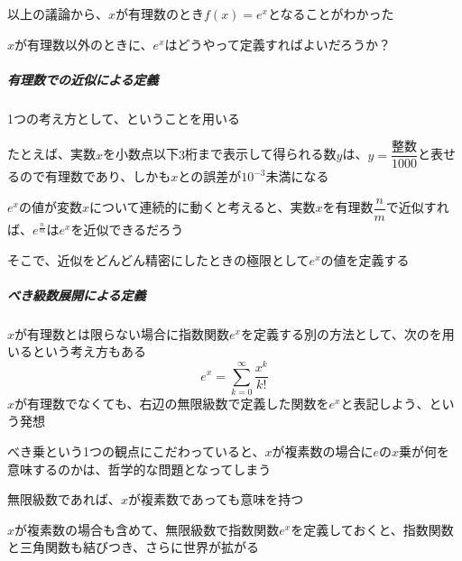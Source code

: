 \documentclass[../book_jiriki_calc]{subfiles}
\begin{document}
\sectionline

以上の議論から、$x$が有理数のとき$f(x)=e^x$となることがわかった

\br

$x$が有理数以外のときに、$e^x$はどうやって定義すればよいだろうか？

\br

\subparagraph{有理数での近似による定義}

1つの考え方として、ということを用いる

たとえば、実数$x$を小数点以下$3$桁まで表示して得られる数$y$は、$y=\dfrac{\text{整数}}{1000}$と表せるので有理数であり、しかも$x$との誤差が$10^{-3}$未満になる

\br

$e^x$の値が変数$x$について連続的に動くと考えると、実数$x$を有理数$\dfrac{n}{m}$で近似すれば、$e^{\frac{n}{m}}$は$e^x$を近似できるだろう

そこで、近似をどんどん精密にしたときの極限として$e^x$の値を定義する

\br

\subparagraph{べき級数展開による定義}

$x$が有理数とは限らない場合に指数関数$e^x$を定義する別の方法として、次のを用いるという考え方もある
\begin{equation}
  e^x = \sum_{k=0}^{\infty} \dfrac{x^k}{k!}
\end{equation}
$x$が有理数でなくても、右辺の無限級数で定義した関数を$e^x$と表記しよう、という発想

\br

べき乗という1つの観点にこだわっていると、$x$が複素数の場合に$e$の$x$乗が何を意味するのかは、哲学的な問題となってしまう

無限級数であれば、$x$が複素数であっても意味を持つ

\br

$x$が複素数の場合も含めて、無限級数で指数関数$e^x$を定義しておくと、指数関数と三角関数も結びつき、さらに世界が拡がる
\end{document}
